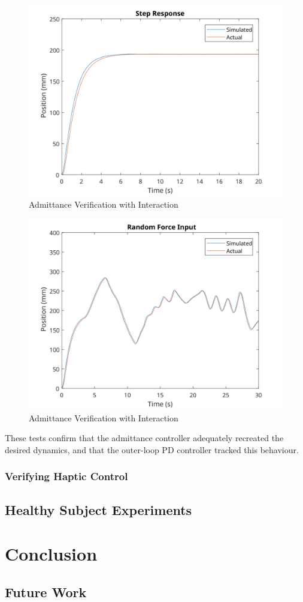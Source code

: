 \documentclass[12pt]{report}
\begin{document}
	
\begin{figure}[t] 
	\centering
	\includegraphics[width=0.9\linewidth]{Mar12_NoForce_Step_Plot}
	\caption{Admittance Verification with Interaction}
	\label{fig:nVerNoInt}
\end{figure}

\begin{figure}[t] 
	\centering
	\includegraphics[width=0.9\linewidth]{Mar12_RandForce_Plot1}
	\caption{Admittance Verification with Interaction}
	\label{fig:VerInt}
\end{figure}
	
	These tests confirm that the admittance controller adequately recreated the desired dynamics, and that the outer-loop PD controller tracked this behaviour. 
	
	\subsection{Verifying Haptic Control}
	
	\section{Healthy Subject Experiments}
	
\chapter{Conclusion}
	\section{Future Work}
	
	


\end{document}
